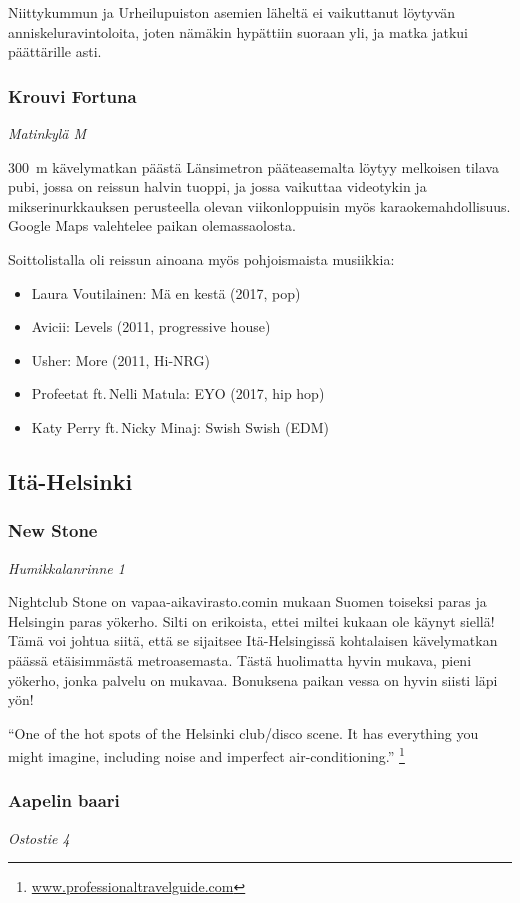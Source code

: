 \documentclass[../ala_hataile.tex]{subfiles}
\begin{document}
Niittykummun ja Urheilu\-puiston asemien läheltä ei vaikuttanut löytyvän anniskelu\-ravintoloita, joten nämäkin hypättiin suoraan yli, ja matka jatkui päättärille asti.

\subsubsection*{Krouvi Fortuna}
\textit{Matinkylä M}

300~m kävelymatkan päästä Länsi\-metron pääte\-asemalta löytyy melkoisen tilava pubi, jossa on reissun halvin tuoppi, ja jossa vaikuttaa video\-tykin ja mikseri\-nurkkauksen perusteella olevan viikon\-loppuisin myös karaoke\-mahdollisuus. Google Maps valehtelee paikan olemassa\-olosta.

Soitto\-listalla oli reissun ainoana myös pohjois\-maista musiikkia:
\begin{itemize}
	\item Laura Voutilainen: Mä en kestä (2017, pop)
	\item Avicii: Levels (2011, progressive house)
	\item Usher: More (2011, Hi-NRG)
	\item Profeetat ft.\,Nelli Matula: EYO (2017, hip hop)
	\item Katy Perry ft.\,Nicky Minaj: Swish Swish (EDM)
\end{itemize}
\subsection*{Itä-Helsinki}
\subsubsection*{New Stone}
\textit{Humikkalanrinne 1}

Nightclub Stone on vapaa-aika\-virasto.comin mukaan Suomen toiseksi paras ja
Helsingin paras yökerho. Silti on erikoista,
ettei miltei kukaan ole käynyt siellä! Tämä
voi johtua siitä, että se sijaitsee Itä-Helsingissä
kohtalaisen kävelymatkan päässä
etäisimmästä metroasemasta. Tästä huolimatta
hyvin mukava, pieni yökerho, jonka
palvelu on mukavaa. Bonuksena paikan
vessa on hyvin siisti läpi yön! 

``One of the hot spots of the Helsinki club/disco scene.
It has everything you might imagine, including
noise and imperfect air-conditioning.''
\footnote{\url{www.professionaltravelguide.com}}
\subsubsection*{Aapelin baari}
\textit{Ostostie 4}
\end{document}

